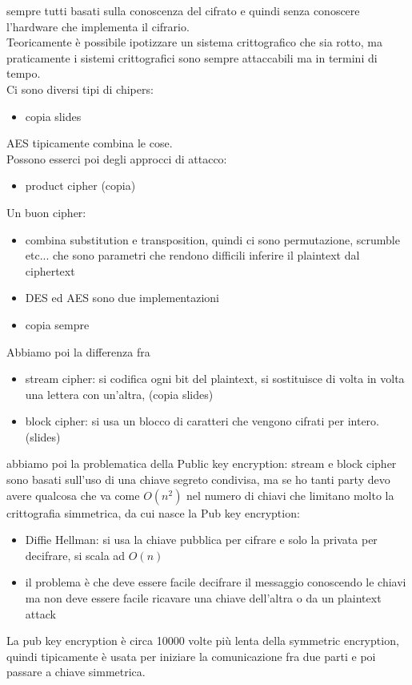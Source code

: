 \documentclass[oneside, 12pt]{extbook}
\begin{document}
sempre tutti basati sulla conoscenza del cifrato e quindi senza conoscere l'hardware che implementa il cifrario.\\Teoricamente è possibile ipotizzare un sistema crittografico che sia rotto, ma praticamente i sistemi crittografici sono sempre attaccabili ma in termini di tempo.\\Ci sono diversi tipi di chipers:
\begin{itemize}
	\item copia slides
\end{itemize}
AES tipicamente combina le cose.\\Possono esserci poi degli approcci di attacco:
\begin{itemize}
	\item product cipher (copia)
\end{itemize}
Un buon cipher:
\begin{itemize}
	\item combina substitution e transposition, quindi ci sono permutazione, scrumble etc... che sono parametri che rendono difficili inferire il plaintext dal ciphertext
	\item DES ed AES sono due implementazioni
	\item copia sempre
\end{itemize}
Abbiamo poi la differenza fra
\begin{itemize}
	\item stream cipher: si codifica ogni bit del plaintext, si sostituisce di volta in volta una lettera con un'altra, (copia slides)
	\item block cipher: si usa un blocco di caratteri che vengono cifrati per intero. (slides)
\end{itemize}
abbiamo poi la problematica della Public key encryption: stream e block cipher sono basati sull'uso di una chiave segreto condivisa, ma se ho tanti party devo avere qualcosa che va come $O(n^2)$ nel numero di chiavi che limitano molto la crittografia simmetrica, da cui nasce la Pub key encryption:
\begin{itemize}
	\item Diffie Hellman: si usa la chiave pubblica per cifrare e solo la privata per decifrare, si scala ad $O(n)$
	\item il problema è che deve essere facile decifrare il messaggio conoscendo le chiavi ma non deve essere facile ricavare una chiave dell'altra o da un plaintext attack
\end{itemize}
La pub key encryption è circa 10000 volte più lenta della symmetric encryption, quindi tipicamente è usata per iniziare la comunicazione fra due parti e poi passare a chiave simmetrica.
\end{document}
